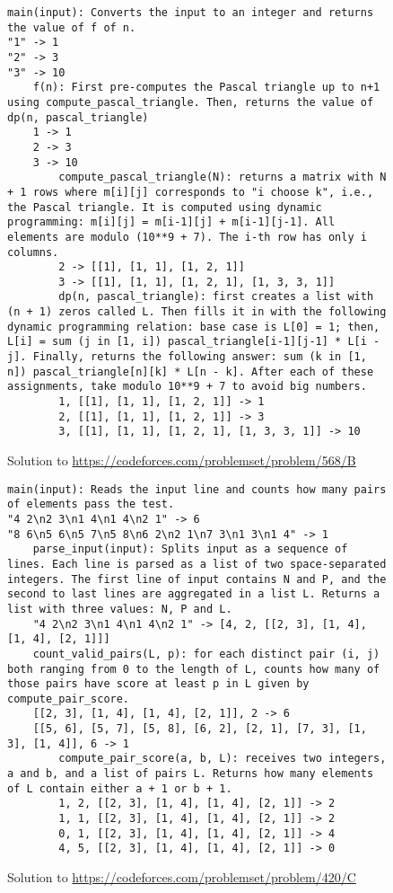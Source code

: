 \begin{figure*}
\begin{lstlisting}
main(input): Converts the input to an integer and returns the value of f of n.
"1" -> 1
"2" -> 3
"3" -> 10
    f(n): First pre-computes the Pascal triangle up to n+1 using compute_pascal_triangle. Then, returns the value of dp(n, pascal_triangle)
    1 -> 1
    2 -> 3
    3 -> 10
        compute_pascal_triangle(N): returns a matrix with N + 1 rows where m[i][j] corresponds to "i choose k", i.e., the Pascal triangle. It is computed using dynamic programming: m[i][j] = m[i-1][j] + m[i-1][j-1]. All elements are modulo (10**9 + 7). The i-th row has only i columns.
        2 -> [[1], [1, 1], [1, 2, 1]]
        3 -> [[1], [1, 1], [1, 2, 1], [1, 3, 3, 1]]
        dp(n, pascal_triangle): first creates a list with (n + 1) zeros called L. Then fills it in with the following dynamic programming relation: base case is L[0] = 1; then, L[i] = sum (j in [1, i]) pascal_triangle[i-1][j-1] * L[i - j]. Finally, returns the following answer: sum (k in [1, n]) pascal_triangle[n][k] * L[n - k]. After each of these assignments, take modulo 10**9 + 7 to avoid big numbers.
        1, [[1], [1, 1], [1, 2, 1]] -> 1
        2, [[1], [1, 1], [1, 2, 1]] -> 3
        3, [[1], [1, 1], [1, 2, 1], [1, 3, 3, 1]] -> 10
\end{lstlisting}
\caption{Solution to \url{https://codeforces.com/problemset/problem/568/B} }
\end{figure*}

\begin{figure*}
\begin{lstlisting}
main(input): Reads the input line and counts how many pairs of elements pass the test.
"4 2\n2 3\n1 4\n1 4\n2 1" -> 6
"8 6\n5 6\n5 7\n5 8\n6 2\n2 1\n7 3\n1 3\n1 4" -> 1
    parse_input(input): Splits input as a sequence of lines. Each line is parsed as a list of two space-separated integers. The first line of input contains N and P, and the second to last lines are aggregated in a list L. Returns a list with three values: N, P and L.
    "4 2\n2 3\n1 4\n1 4\n2 1" -> [4, 2, [[2, 3], [1, 4], [1, 4], [2, 1]]]
    count_valid_pairs(L, p): for each distinct pair (i, j) both ranging from 0 to the length of L, counts how many of those pairs have score at least p in L given by compute_pair_score.
    [[2, 3], [1, 4], [1, 4], [2, 1]], 2 -> 6
    [[5, 6], [5, 7], [5, 8], [6, 2], [2, 1], [7, 3], [1, 3], [1, 4]], 6 -> 1
        compute_pair_score(a, b, L): receives two integers, a and b, and a list of pairs L. Returns how many elements of L contain either a + 1 or b + 1.
        1, 2, [[2, 3], [1, 4], [1, 4], [2, 1]] -> 2
        1, 1, [[2, 3], [1, 4], [1, 4], [2, 1]] -> 2
        0, 1, [[2, 3], [1, 4], [1, 4], [2, 1]] -> 4
        4, 5, [[2, 3], [1, 4], [1, 4], [2, 1]] -> 0
\end{lstlisting}
\caption{Solution to \url{https://codeforces.com/problemset/problem/420/C}}
\end{figure*}

